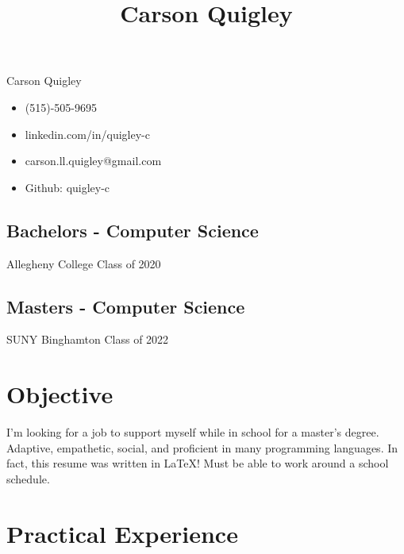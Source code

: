 \documentclass[12pt]{article}
\title{Carson Quigley}
\date{}
\begin{document}
\pagestyle{empty}

\begin{multicols}{3}

\begingroup
    \LARGE Carson Quigley\\[0em]
\endgroup

\vfill\null

\begin{itemize}
    \item[] (515)-505-9695
    \item[] linkedin.com/in/quigley-c

\vfill\null

    \item[] carson.ll.quigley@gmail.com
    \item[] Github: quigley-c

\vfill\null

\end{itemize}
\end{multicols}

\vspace{-1.5em}
\noindent\makebox[\linewidth]{\rule{\paperwidth}{0.4pt}}

\begingroup
\centering
\begin{multicols}{2}
\subsection*{Bachelors - Computer Science}
Allegheny College Class of 2020

\subsection*{Masters - Computer Science}
SUNY Binghamton Class of 2022

\end{multicols}
\endgroup


\begingroup
\centering
\section*{Objective}
I'm looking for a job to support myself while in school for a master's degree. 
Adaptive, empathetic, social, and proficient in many programming languages. 
In fact, this resume was written in LaTeX! Must be able to work around a school schedule.
\endgroup


\section*{Practical Experience}
\end{document}
